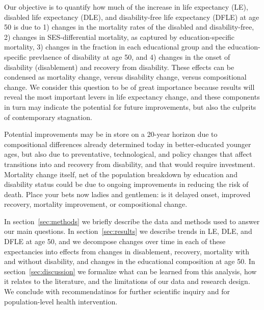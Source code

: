 Our objective is to quantify how much of the increase in life expectancy (LE), disabled life expectancy (DLE), and disability-free life expectancy (DFLE) at age 50 is due to 1) changes in the mortality rates of the disabled and disability-free, 2) changes in SES-differential mortality, as captured by education-specific mortality, 3) changes in the fraction in each educational group and the education-specific prevlaence of disability at age 50, and 4) changes in the onset of disability (disablement) and recovery from disability. These effects can be condensed as mortality change, versus disability change, versus compositional change. We consider this question to be of great importance because results will reveal the most important levers in life expectancy change, and these components in turn may indicate the potential for future improvements, but also the culprits of contemporary stagnation. 

Potential improvements may be in store on a 20-year horizon due to compositional differences already determined today in better-educated younger ages, but also due to preventative, technological, and policy changes that affect transitions into and recovery from disability, and that would require investment. Mortality change itself, net of the population breakdown by education and disability status could be due to ongoing improvements in reducing the risk of death. Place your bets now ladies and gentlemen: is it delayed onset, improved recovery, mortality improvement, or compositional change. 

In section~\ref{sec:methods} we briefly describe the data and methods used to answer our main questions. In section~\ref{sec:results} we describe trends in LE, DLE, and DFLE at age 50, and we decompose changes over time in each of these expectancies into effects from changes in disablement, recovery, mortality with and without disability, and changes in the educational composition at age 50. In section~\ref{sec:discussion} we formalize what can be learned from this analysis, how it relates to the literature, and the limitations of our data and research design. We conclude with recommendatinos for further scientific inquiry and for population-level health intervention.


